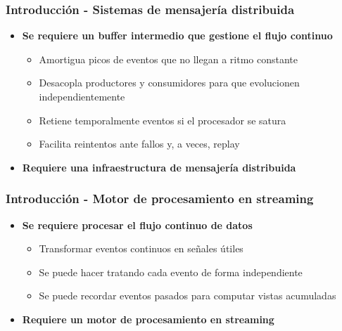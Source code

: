 \documentclass[aspectratio=169]{beamer}
\begin{document}
\begin{frame}
\frametitle{Introducción - Sistemas de mensajería distribuida}
	\begin{itemize}
		\item \textbf{Se requiere un buffer intermedio que gestione el flujo continuo}
		\begin{itemize}
			\item Amortigua picos de eventos que no llegan a ritmo constante
			\item Desacopla productores y consumidores para que evolucionen independientemente
			\item Retiene temporalmente eventos si el procesador se satura
			\item Facilita reintentos ante fallos y, a veces, replay
		\end{itemize}

		\vspace{1em}

    \item \textbf{Requiere una infraestructura de mensajería distribuida}
	\end{itemize}
\end{frame}

\begin{frame}
\frametitle{Introducción - Motor de procesamiento en streaming}
	\begin{itemize}
		\item \textbf{Se requiere procesar el flujo continuo de datos}
		\begin{itemize}
      \item Transformar eventos continuos en señales útiles
			\item Se puede hacer tratando cada evento de forma independiente
      \item Se puede recordar eventos pasados para computar vistas acumuladas
		\end{itemize}

		\vspace{1em}

		\item \textbf{Requiere un motor de procesamiento en streaming}
	\end{itemize}
\end{frame}
\end{document}
